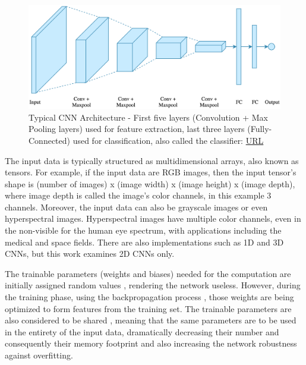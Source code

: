 \begin{figure} [H]
	\centering
	\includegraphics[width=\textwidth]{../Images/CNNArchitectures/typical-cnn-architecture.png}
	\decoRule
	\caption[Typical CNN Architecture]{Typical CNN Architecture - First five layers (Convolution + Max Pooling layers) used for feature extraction, last three layers (Fully-Connected) used for classification, also called the classifier: \href{https://www.kaggle.com/mauddib/digit-recogniser-tutorial-using-a-cnn-tensorflow}{URL}}
	\label{fig:typical-cnn-architecture}
\end{figure}

The input data is typically structured as multidimensional arrays, also known as tensors. For example, if the input data are RGB images, then the input tensor's shape is (number of images) x (image width) x (image height) x (image depth), where image depth is called the image's color channels, in this example 3 channels. Moreover, the input data can also be grayscale images or even hyperspectral images. Hyperspectral images have multiple color channels, even in the non-visible for the human eye spectrum, with applications including the medical and space fields. There are also implementations such as 1D and 3D CNNs, but this work examines 2D CNNs only.

The trainable parameters (weights and biases) needed for the computation are initially assigned random values \cite{Practical-recommendations-for-gradient-based-training-of-deep-architectures}, rendering the network useless. However, during the training phase, using the backpropagation process \cite{Learning-internal-representations-by-error-propagation}, those weights are being optimized to form features from the training set. The trainable parameters are also considered to be shared \cite{Generalization-and-network-design-strategies}, meaning that the same parameters are to be used in the entirety of the input data, dramatically decreasing their number and consequently their memory footprint and also increasing the network robustness against overfitting.

